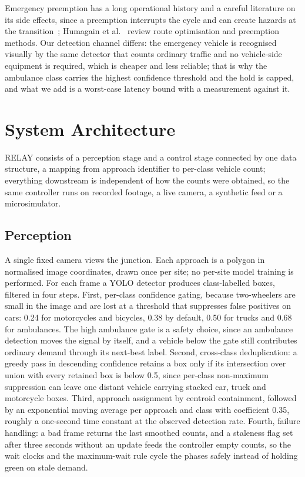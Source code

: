 \documentclass[journal]{IEEEtran}
\newcommand{\relay}{RELAY}
\begin{document}
Emergency preemption has a long operational history and a careful literature on its side effects, since a
preemption interrupts the cycle and can create hazards at the transition~\cite{louisell2004simple}; Humagain et al.~\cite{humagain2020systematic} review route optimisation and preemption methods. Our
detection channel differs: the emergency vehicle is recognised visually by the same detector that counts
ordinary traffic and no vehicle-side equipment is required, which is cheaper and less reliable; that is why the ambulance
class carries the highest confidence threshold and the hold is capped, and what we add is a worst-case
latency bound with a measurement against it.

\section{System Architecture}

\relay{} consists of a perception stage and a control stage connected by one data structure, a mapping from
approach identifier to per-class vehicle count; everything downstream is independent of how the counts were
obtained, so the same controller runs on recorded footage, a live camera, a synthetic feed or a
microsimulator.

\subsection{Perception}

A single fixed camera views the junction. Each approach is a polygon in normalised image coordinates, drawn once
per site; no per-site model training is performed. For each frame a YOLO detector produces class-labelled boxes,
filtered in four steps. First, per-class confidence gating, because two-wheelers are small in the image and are
lost at a threshold that suppresses false positives on cars: 0.24 for motorcycles and bicycles, 0.38 by
default, 0.50 for trucks and 0.68 for ambulances. The high ambulance gate is a safety choice, since an
ambulance detection moves the signal by itself, and a vehicle below the gate still contributes ordinary demand
through its next-best label. Second, cross-class deduplication: a greedy pass in descending confidence retains
a box only if its intersection over union with every retained box is below 0.5, since per-class
non-maximum suppression can leave one distant vehicle carrying stacked car, truck and motorcycle boxes. Third,
approach assignment by centroid containment, followed by an exponential moving average per approach and class
with coefficient 0.35, roughly a one-second time constant at the observed detection rate. Fourth, failure
handling: a bad frame returns the last smoothed counts, and a staleness flag set after three seconds without
an update feeds the controller empty counts, so the wait clocks and the maximum-wait rule cycle the phases
safely instead of holding green on stale demand.
\end{document}
